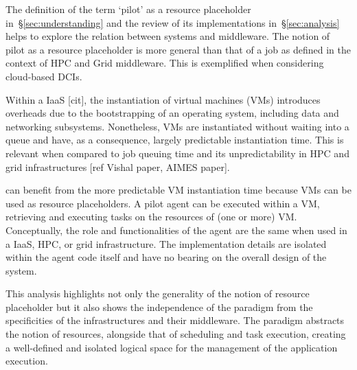 \documentclass{sig-alternate}
\begin{document}


The definition of the term `pilot' as a resource placeholder
in~\S\ref{sec:understanding} and the review of its implementations
in~\S\ref{sec:analysis} helps to explore the relation between \pilot systems
and middleware. The notion of pilot as a resource placeholder is more general
than that of a job as defined in the context of HPC and Grid middleware. This
is exemplified when considering cloud-based DCIs.

Within a IaaS [cit], the instantiation of virtual machines (VMs) introduces
overheads due to the bootstrapping of an operating system, including data and
networking subsystems. Nonetheless, VMs are instantiated without waiting into a
queue and have, as a consequence, largely predictable instantiation time. This
is relevant when compared to job queuing time and its unpredictability in HPC
and grid infrastructures [ref Vishal paper, AIMES paper].

\pilot can benefit from the more predictable VM instantiation time because VMs
can be used as resource placeholders. A pilot agent can be executed within a
VM, retrieving and executing tasks on the resources of (one or more) VM.
Conceptually, the role and functionalities of the \pilot agent are the same
when used in a IaaS, HPC, or grid infrastructure. The implementation details
are isolated within the agent code itself and have no bearing on the overall
design of the \pilot system.

This analysis highlights not only the generality of the notion of resource
placeholder but it also shows the independence of the \pilot paradigm from the
specificities of the infrastructures and their middleware. The \pilot paradigm
abstracts the notion of resources, alongside that of scheduling and task
execution, creating a well-defined and isolated logical space for the
management of the application execution.
\end{document}
